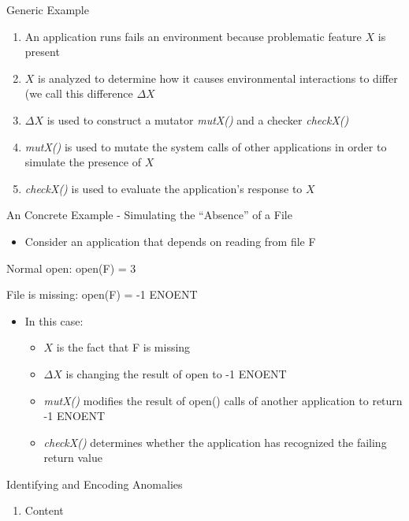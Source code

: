 \documentclass[pdf]{beamer}
\begin{document}
\begin{frame}{Generic Example}
  \begin{enumerate}
    \item{An application runs fails an environment because problematic
      feature $X$ is present}
    \item{$X$ is analyzed to determine how it causes environmental
      interactions to differ (we call this difference $\Delta X$}
    \item{$\Delta X$ is used to construct a mutator \textit{mutX()} and
      a checker \textit{checkX()}}
    \item{\textit{mutX()} is used to mutate the system calls of other
      applications in order to simulate the presence of $X$}
    \item{\textit{checkX()} is used to evaluate the application's response
      to $X$}
  \end{enumerate}
\end{frame}


\begin{frame}{An Concrete Example - Simulating the ``Absence'' of a File}
  \begin{itemize}
  \item{Consider an application that depends on reading from file F}
  \end{itemize}

  Normal open: open(F) = 3

  File is missing: open(F) = -1 ENOENT

  \begin{itemize}
  \item{In this case:}
    \begin{itemize}
      \item{$X$ is the fact that F is missing}
      \item{$\Delta X$ is changing the result of open to -1 ENOENT}
      \item{\textit{mutX()} modifies the result of open() calls of another
        application to return -1 ENOENT}
      \item{\textit{checkX()} determines whether the application has
        recognized the failing return value}
    \end{itemize}
  \end{itemize}
\end{frame}


\begin{frame}{Identifying and Encoding Anomalies}
  \begin{enumerate}
  \item{Content}
  \end{enumerate}
\end{frame}
\end{document}
